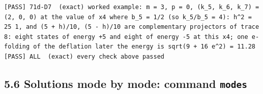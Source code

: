 \documentclass[
  10pt,
]{article}
\begin{document}
\begin{verbatim}
[PASS] 71d-D7  (exact) worked example: m = 3, p = 0, (k_5, k_6, k_7) = (2, 0, 0) at the value of x4 where b_5 = 1/2 (so k_5/b_5 = 4): h^2 = 25 1, and (5 + h)/10, (5 - h)/10 are complementary projectors of trace 8: eight states of energy +5 and eight of energy -5 at this x4; one e-folding of the deflation later the energy is sqrt(9 + 16 e^2) = 11.28
[PASS] ALL  (exact) every check above passed
\end{verbatim}

\hypertarget{solutions-mode-by-mode-command-modes}{%
\subsection{\texorpdfstring{5.6 Solutions mode by mode: command
\texttt{modes}}{5.6 Solutions mode by mode: command modes}}\label{solutions-mode-by-mode-command-modes}}
\end{document}
